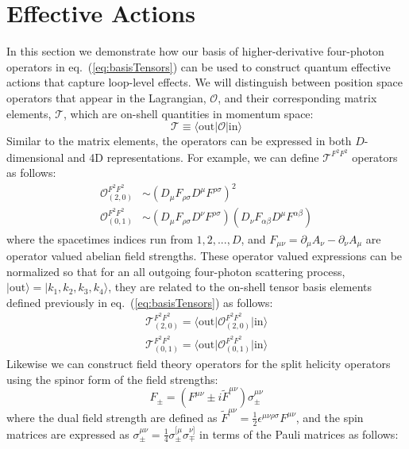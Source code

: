 \documentclass[11pt,letter]{article}
\def\eqn#1{eq.~(\ref{#1})}
\begin{document}
\section{Effective Actions} \label{sec:Actions}
In this section we demonstrate how our basis of higher-derivative four-photon operators in \eqn{eq:basisTensors} can be used to construct quantum effective actions that capture loop-level effects. We will distinguish between position space operators that appear in the Lagrangian, $\mathcal{O}$, and their corresponding matrix elements, $\mathcal{T}$, which are on-shell quantities in momentum space:
\begin{equation}\label{eq:OpsVsTens}
\mathcal{T} \equiv \langle \text{out}| \mathcal{O}|\text{in}\rangle
\end{equation}
Similar to the matrix elements, the operators can be expressed in both $D$-dimensional and 4D representations. For example, we can define $\mathcal{T}^{F^2F^2}$ operators as follows:
\begin{align}
\mathcal{O}^{F^2F^2}_{(2,0)} &\sim (D_\mu F_{\rho\sigma}D^\mu F^{\rho\sigma})^2
\\
\mathcal{O}^{F^2F^2}_{(0,1)} &\sim (D_\mu F_{\rho\sigma}D^\nu F^{\rho\sigma})(D_\nu F_{\alpha\beta}D^\mu F^{\alpha\beta})
\end{align}
where the spacetimes indices run from $1,2,...,D$, and $F_{\mu\nu} = \partial_\mu A_\nu - \partial_\nu A_\mu$ are operator valued abelian field strengths. These operator valued expressions can be normalized so that for an all outgoing four-photon scattering process, $|\text{out}\rangle = |k_1,k_2,k_3,k_4\rangle$, they are related to the on-shell tensor basis elements defined previously in \eqn{eq:basisTensors} as follows:
\begin{align}
\mathcal{T}^{F^2F^2}_{(2,0)} =\langle \text{out}\big|\mathcal{O}^{F^2F^2}_{(2,0)} \big|\text{in}\rangle
\\
\mathcal{T}^{F^2F^2}_{(0,1)} =\langle \text{out} \big|\mathcal{O}^{F^2F^2}_{(0,1)}\big |\text{in}\rangle
\end{align}
Likewise we can construct field theory operators for the split helicity operators using the spinor form of the field strengths:
\begin{equation}
F_\pm = (F^{\mu\nu} \pm i \tilde{F}^{\mu\nu})\sigma^{\mu\nu}_\pm
\end{equation}
where the dual field strength are defined as $\tilde{F}^{\mu\nu}= \frac{1}{2}\epsilon^{\mu\nu\rho\sigma}F^{\mu\nu}$, and the spin matrices are expressed as $\sigma^{\mu\nu}_\pm = \frac{1}{4} \sigma^{[\mu}_\pm \sigma^{\nu]}_\mp$ in terms of the Pauli matrices as follows:
\end{document}
